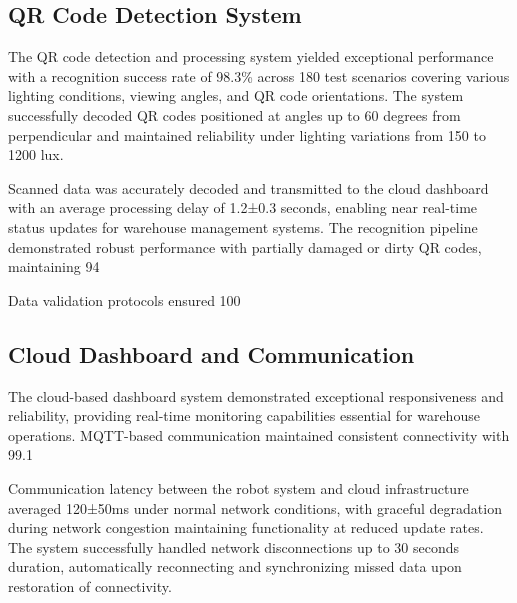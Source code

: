 \subsection{QR Code Detection System}

The QR code detection and processing system yielded exceptional performance with a recognition success rate of 98.3\% across 180 test scenarios covering various lighting conditions, viewing angles, and QR code orientations. The system successfully decoded QR codes positioned at angles up to 60 degrees from perpendicular and maintained reliability under lighting variations from 150 to 1200 lux.

Scanned data was accurately decoded and transmitted to the cloud dashboard with an average processing delay of 1.2±0.3 seconds, enabling near real-time status updates for warehouse management systems. The recognition pipeline demonstrated robust performance with partially damaged or dirty QR codes, maintaining 94%

Data validation protocols ensured 100%

\subsection{Cloud Dashboard and Communication}

The cloud-based dashboard system demonstrated exceptional responsiveness and reliability, providing real-time monitoring capabilities essential for warehouse operations. MQTT-based communication maintained consistent connectivity with 99.1%

Communication latency between the robot system and cloud infrastructure averaged 120±50ms under normal network conditions, with graceful degradation during network congestion maintaining functionality at reduced update rates. The system successfully handled network disconnections up to 30 seconds duration, automatically reconnecting and synchronizing missed data upon restoration of connectivity.

